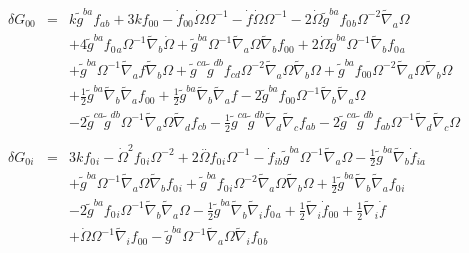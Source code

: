 \begin{eqnarray}
\delta G_{00}&=& k \tilde{g}^{ba} f_{ab} + 3 k f_{00}{} -  \dot{f}_{00}{} \dot{\Omega} \Omega^{-1} -  \dot{f} \dot{\Omega} \Omega^{-1} - 2 \dot{\Omega} \tilde{g}^{ba} f_{0}{}_{b} \Omega^{-2} \tilde{\nabla}_{a}\Omega  
\nonumber\\
&&+ 4 \tilde{g}^{ba} f_{0}{}_{a} \Omega^{-1} \tilde{\nabla}_{b}\dot{\Omega} + \tilde{g}^{ba} \Omega^{-1} \tilde{\nabla}_{a}\Omega \tilde{\nabla}_{b}f_{00}{} + 2 \dot{\Omega} \tilde{g}^{ba} \Omega^{-1} \tilde{\nabla}_{b}f_{0}{}_{a} 
\nonumber\\
&& + \tilde{g}^{ba} \Omega^{-1} \tilde{\nabla}_{a}f \tilde{\nabla}_{b}\Omega + \tilde{g}^{ca} \tilde{g}^{db} f_{cd} \Omega^{-2} \tilde{\nabla}_{a}\Omega \tilde{\nabla}_{b}\Omega  + \tilde{g}^{ba} f_{00}{} \Omega^{-2} \tilde{\nabla}_{a}\Omega \tilde{\nabla}_{b}\Omega  
\nonumber\\
&&+ \tfrac{1}{2} \tilde{g}^{ba} \tilde{\nabla}_{b}\tilde{\nabla}_{a}f_{00}{} + \tfrac{1}{2} \tilde{g}^{ba} \tilde{\nabla}_{b}\tilde{\nabla}_{a}f  - 2 \tilde{g}^{ba} f_{00}{} \Omega^{-1} \tilde{\nabla}_{b}\tilde{\nabla}_{a}\Omega  
\nonumber\\
&&- 2 \tilde{g}^{ca} \tilde{g}^{db} \Omega^{-1} \tilde{\nabla}_{a}\Omega \tilde{\nabla}_{d}f_{cb} -  \tfrac{1}{2} \tilde{g}^{ca} \tilde{g}^{db} \tilde{\nabla}_{d}\tilde{\nabla}_{c}f_{ab}  
- 2 \tilde{g}^{ca} \tilde{g}^{db} f_{ab} \Omega^{-1} \tilde{\nabla}_{d}\tilde{\nabla}_{c}\Omega 
\nonumber\\
\\
\delta G_{0i}&=& 3 k f_{0}{}_{i} -  \dot{\Omega}^2 f_{0}{}_{i} \Omega^{-2} + 2 \overset{..}{\Omega} f_{0}{}_{i} \Omega^{-1} -  \dot{f}_{ib} \tilde{g}^{ba} \Omega^{-1} \tilde{\nabla}_{a}\Omega -  \tfrac{1}{2} \tilde{g}^{ba} \tilde{\nabla}_{b}\dot{f}_{ia}  
\nonumber\\
&&+ \tilde{g}^{ba} \Omega^{-1} \tilde{\nabla}_{a}\Omega \tilde{\nabla}_{b}f_{0}{}_{i} + \tilde{g}^{ba} f_{0}{}_{i} \Omega^{-2} \tilde{\nabla}_{a}\Omega \tilde{\nabla}_{b}\Omega + \tfrac{1}{2} \tilde{g}^{ba} \tilde{\nabla}_{b}\tilde{\nabla}_{a}f_{0}{}_{i} 
\nonumber\\
&& - 2 \tilde{g}^{ba} f_{0}{}_{i} \Omega^{-1} \tilde{\nabla}_{b}\tilde{\nabla}_{a}\Omega -  \tfrac{1}{2} \tilde{g}^{ba} \tilde{\nabla}_{b}\tilde{\nabla}_{i}f_{0}{}_{a} + \tfrac{1}{2} \tilde{\nabla}_{i}\dot{f}_{00}{} + \tfrac{1}{2} \tilde{\nabla}_{i}\dot{f}  
\nonumber\\
&&+ \dot{\Omega} \Omega^{-1} \tilde{\nabla}_{i}f_{00}{} -  \tilde{g}^{ba} \Omega^{-1} \tilde{\nabla}_{a}\Omega \tilde{\nabla}_{i}f_{0}{}_{b}

\end{eqnarray}
